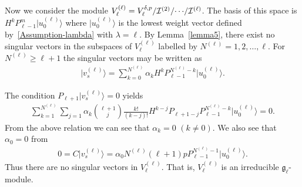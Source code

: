 Now we consider the module $ V^{(\ell)}_{\ell} = V^{\delta,p}_{\ell}/{\cal I}^{(2)}/ {\cdots } /{\cal I}^{(\ell)}$.
The basis of this space is $ H^k P_{\ell{-}1}^m \big|u_0^{(\ell)}\big\rangle  $ where $ \big|u_0^{(\ell)}\big\rangle  $ is the lowest weight
vector def\/ined by~\eqref{Assumption-lambda} with $ \lambda = \ell$.
By Lemma~\ref{lemma5}, there exist no singular vectors in the subspaces of $ V^{(\ell)}_{\ell} $ labelled by $
N^{(\ell)} = 1, 2, \dots, \ell$.
For $ N^{(\ell)} \geq \ell+1 $ the singular vectors may be written as
\begin{gather*}
\big|v_s^{(\ell)}\big\rangle  = \sum\limits_{k=0}^{N^{(\ell)}} \alpha_k H^k P_{\ell-1}^{N^{(\ell)}-k} \big|u_0^{(\ell)}\big\rangle .
\end{gather*}

The condition $ P_{\ell+1} \big|v_s^{(\ell)}\big\rangle  = 0 $ yields
\begin{gather*}
\sum\limits_{k=1}^{N^{(\ell)}} \sum\limits_{j=1} \alpha_k \binom{\ell+1}{j} \frac{k!}{(k-j)!} H^{k-j} P_{\ell+1-j}
P_{\ell-1}^{N^{(\ell)}-k} \big|u_0^{(\ell)}\big\rangle  = 0.
\end{gather*}
From the above relation we can see that $ \alpha_k = 0$ $(k \neq 0)$.
We also see that $ \alpha_0 = 0 $ from
\begin{gather*}
0 = C \big|v_s^{(\ell)}\big\rangle  = \alpha_0 N^{(\ell)} (\ell+1) p P_{\ell-1}^{N^{(\ell)}-1} \big|u_0^{(\ell)}\big\rangle .
\end{gather*}
Thus there are no singular vectors in $ V^{(\ell)}_{\ell}$.
That is, $ V^{(\ell)}_{\ell} $ is an irreducible ${\mathfrak g}_{\ell}$-module.
